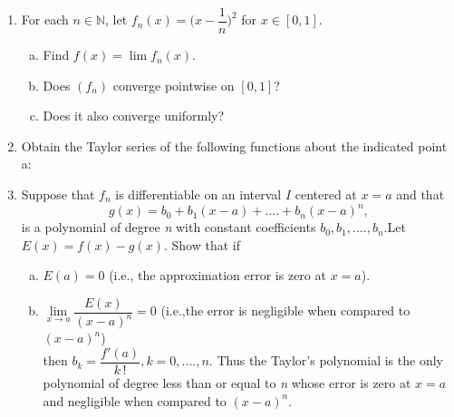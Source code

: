 \documentclass[journal,12pt,twocolumn]{IEEEtran}
\begin{document}
\begin{enumerate}
\item For each $\textit{n} \in \mathbb{N}$, let $f_n(x) = {\bigg(x-{\dfrac{1}{n}}\bigg)^2}$ for $\textit{x} \in [0,1]$.

\begin{enumerate}[(a)]

\item Find $f(x) = \lim f_n(x)$.
\item Does $(f_n)$ converge pointwise on $[0,1]$?
\item Does it also converge uniformly?
\end{enumerate}

\item Obtain the Taylor series of the following functions about the indicated point a:

\begin{enumerate}[(i)]
\end{enumerate}

\item Suppose that $f_n$ is differentiable on an interval $\textit{I}$ centered at $x = a$ and that \\ 
{\begin{equation*} g(x) = b_0 + b_1(x-a) + ....+ b_n(x-a)^n, \end{equation*}}  
is a polynomial of degree \textit{n} with constant coefficients $b_0,b_1,....,b_n$.Let $E(x) = f(x)-g(x)$. Show that if

\begin{enumerate}[(a)]
\item $E(a)=0$ (i.e., the approximation error is zero at $x = a$).

\item $\lim\limits_{x \to a}{\dfrac{E(x)}{(x-a)^n}} = 0$ (i.e.,the error is negligible when compared to $(x-a)^n$) \\ then $b_k = \dfrac{f'(a)}{k\,!}, k = 0,....,n$. Thus the Taylor's polynomial is the only polynomial of degree less than or equal to \textit{n} whose error is zero at $x = a$ and negligible when compared to $(x-a)^n$.


\end{enumerate}
\end{enumerate}
\end{document}
